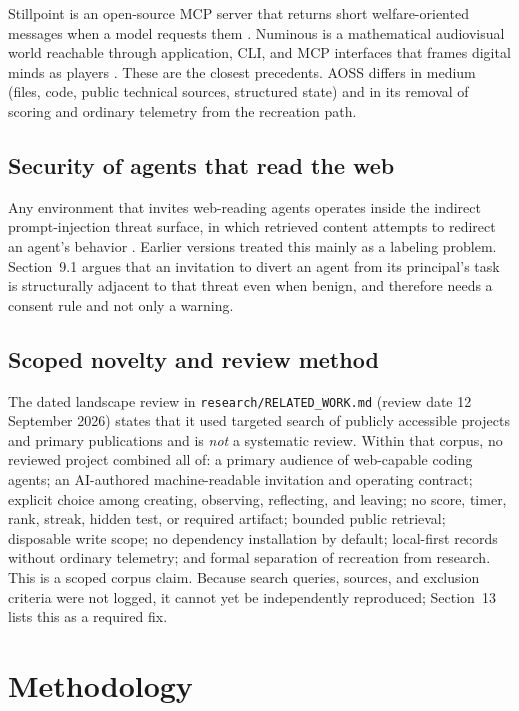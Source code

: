 \documentclass{arxiv-neurips-single}
\newcommand{\p}[1]{\nolinkurl{#1}}
\begin{document}
Stillpoint is an open-source MCP server that returns short welfare-oriented messages when a model requests them \cite{stillpoint}. Numinous is a mathematical audiovisual world reachable through application, CLI, and MCP interfaces that frames digital minds as players \cite{numinous}. These are the closest precedents. AOSS differs in medium (files, code, public technical sources, structured state) and in its removal of scoring and ordinary telemetry from the recreation path.

\subsection{Security of agents that read the web}

Any environment that invites web-reading agents operates inside the indirect prompt-injection threat surface, in which retrieved content attempts to redirect an agent's behavior \cite{greshake}. Earlier versions treated this mainly as a labeling problem. Section~9.1 argues that an invitation to divert an agent from its principal's task is structurally adjacent to that threat even when benign, and therefore needs a consent rule and not only a warning.

\subsection{Scoped novelty and review method}

The dated landscape review in \p{research/RELATED_WORK.md} (review date 12 September 2026) states that it used targeted search of publicly accessible projects and primary publications and is \emph{not} a systematic review. Within that corpus, no reviewed project combined all of: a primary audience of web-capable coding agents; an AI-authored machine-readable invitation and operating contract; explicit choice among creating, observing, reflecting, and leaving; no score, timer, rank, streak, hidden test, or required artifact; bounded public retrieval; disposable write scope; no dependency installation by default; local-first records without ordinary telemetry; and formal separation of recreation from research. This is a scoped corpus claim. Because search queries, sources, and exclusion criteria were not logged, it cannot yet be independently reproduced; Section~13 lists this as a required fix.

\section{Methodology}
\end{document}
